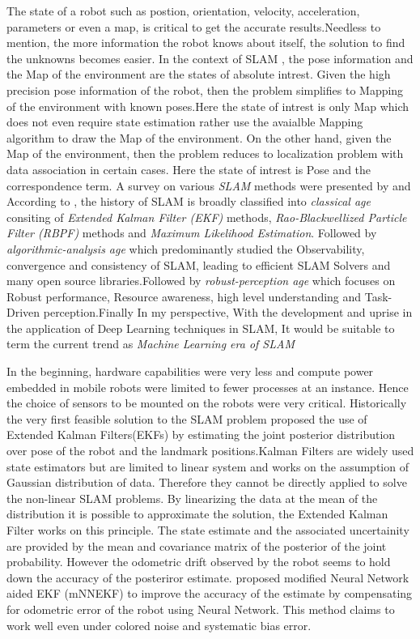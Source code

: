     The state of a robot such as postion, orientation, velocity, acceleration, parameters or even a map, is critical to get the accurate results.Needless to mention, the more information the robot
    knows about itself, the solution to find the unknowns becomes easier. In the context of SLAM , the pose information and the Map of the environment are the states of absolute intrest. Given the
    high precision pose information of the robot, then the problem simplifies to Mapping of the environment with known poses.Here the state of intrest is only Map which does not even require state 
    estimation rather use the avaialble Mapping algorithm to draw the Map of the environment. On the other hand, given the Map of the environment, then the problem reduces to localization problem 
    with data association in certain cases. Here the state of intrest is Pose and the correspondence term. A survey on various \textit{SLAM} methods were presented by \cite{C.Cadena} and \cite{T.Takleh}
    According to \cite{C.Cadena}, the history of SLAM is broadly classified into \textit{classical age} consiting of \textit{Extended Kalman Filter (EKF)} methods, \textit{Rao-Blackwellized Particle Filter (RBPF)} methods
    and \textit{Maximum Likelihood Estimation}. Followed by \textit{algorithmic-analysis age} which predominantly studied the Observability, convergence and consistency of SLAM, leading to efficient SLAM Solvers and
    many open source libraries.Followed by \textit{robust-perception age} which focuses on Robust performance, Resource awareness, high level understanding and Task-Driven perception.Finally In my 
    perspective, With the development and uprise in the application of Deep Learning techniques in SLAM, It would be suitable to term the current trend as \textit{Machine Learning era of SLAM}

    In the beginning, hardware capabilities were very less and compute power embedded in mobile robots were limited to fewer processes at an instance. Hence the choice of sensors to be mounted on 
    the robots were very critical. Historically the very first feasible solution to the SLAM problem proposed the use of Extended Kalman Filters(EKFs) by estimating the joint posterior distribution 
    over pose of the robot and the landmark positions.Kalman Filters are widely used state estimators but are limited to linear system and works on the assumption of Gaussian distribution of data.
    Therefore they cannot be directly applied to solve the non-linear SLAM problems. By linearizing the data at the mean of the distribution it is possible to approximate the solution, the Extended
    Kalman Filter works on this principle. The state estimate and the associated uncertainity are provided by the mean and covariance matrix of the posterior of the joint probability. 
    However the odometric drift observed by the robot seems to hold down the accuracy of the posteriror estimate.\cite{J.Kang} proposed  modified 
    Neural Network aided EKF (mNNEKF) to improve the accuracy of the estimate by compensating for odometric error of the robot using Neural Network. This method claims to work well even under
    colored noise and systematic bias error.

